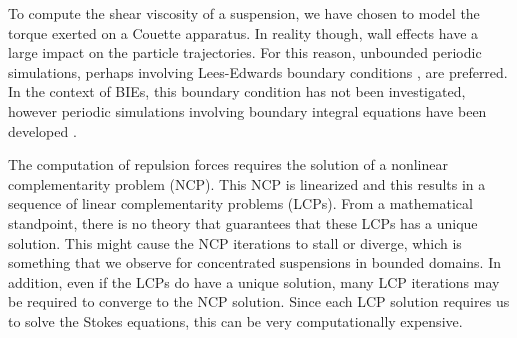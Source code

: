 To compute the shear viscosity of a suspension, we have chosen to model the torque exerted on a Couette apparatus. In reality though, wall effects have a large impact on the particle trajectories. For this reason, unbounded periodic simulations, perhaps involving Lees-Edwards boundary conditions \cite{Lees1972}, are preferred. In the context of BIEs, this boundary condition has not been investigated, however periodic simulations involving boundary integral equations have been developed \cite{Klinteberg2014,Marple2015}.

The computation of repulsion forces requires the solution of a nonlinear complementarity problem (NCP). This NCP is linearized and this results in a sequence of linear complementarity problems (LCPs). From a mathematical standpoint, there is no theory that guarantees that these LCPs has a unique solution. This might cause the NCP iterations to stall or diverge, which is something that we observe for concentrated suspensions in bounded domains. In addition, even if the LCPs do have a unique solution, many LCP iterations may be required to converge to the NCP solution. Since each LCP solution requires us to solve the Stokes equations, this can be very computationally expensive. 

